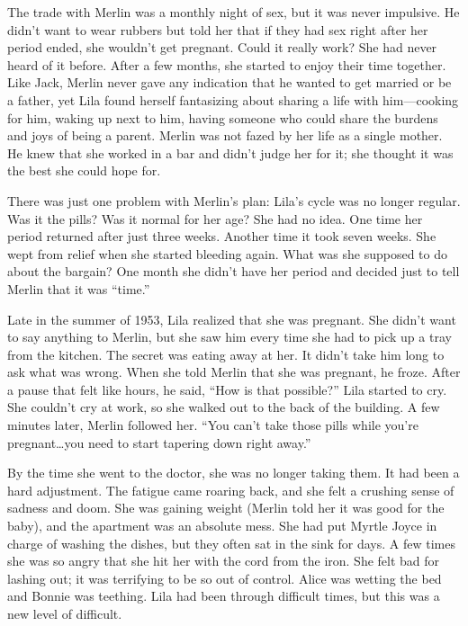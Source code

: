 \documentclass[
  american,
  letterpaper,
]{book}
\begin{document}
The trade with Merlin was a monthly night of sex, but it was never
impulsive. He didn't want to wear rubbers but told her that if they had
sex right after her period ended, she wouldn't get pregnant. Could it
really work? She had never heard of it before. After a few months, she
started to enjoy their time together. Like Jack, Merlin never gave any
indication that he wanted to get married or be a father, yet Lila found
herself fantasizing about sharing a life with him---cooking for him,
waking up next to him, having someone who could share the burdens and
joys of being a parent. Merlin was not fazed by her life as a single
mother. He knew that she worked in a bar and didn't judge her for it;
she thought it was the best she could hope for.

There was just one problem with Merlin's plan: Lila's cycle was no
longer regular. Was it the pills? Was it normal for her age? She had no
idea. One time her period returned after just three weeks. Another time
it took seven weeks. She wept from relief when she started bleeding
again. What was she supposed to do about the bargain? One month she
didn't have her period and decided just to tell Merlin that it was
``time.''

Late in the summer of 1953, Lila realized that she was pregnant. She
didn't want to say anything to Merlin, but she saw him every time she
had to pick up a tray from the kitchen. The secret was eating away at
her. It didn't take him long to ask what was wrong. When she told Merlin
that she was pregnant, he froze. After a pause that felt like hours, he
said, ``How is that possible?'' Lila started to cry. She couldn't cry at
work, so she walked out to the back of the building. A few minutes
later, Merlin followed her. ``You can't take those pills while you're
pregnant\ldots you need to start tapering down right away.''

By the time she went to the doctor, she was no longer taking them. It
had been a hard adjustment. The fatigue came roaring back, and she felt
a crushing sense of sadness and doom. She was gaining weight (Merlin
told her it was good for the baby), and the apartment was an absolute
mess. She had put Myrtle Joyce in charge of washing the dishes, but they
often sat in the sink for days. A few times she was so angry that she
hit her with the cord from the iron. She felt bad for lashing out; it
was terrifying to be so out of control. Alice was wetting the bed and
Bonnie was teething. Lila had been through difficult times, but this was
a new level of difficult.
\end{document}

